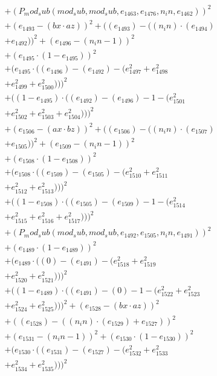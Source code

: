\documentclass[10pt, a4paper]{article}
\begin{document}
\begin{small}
\begin{align*}
& + (P_mod_sub(mod_sub, mod_sub, e_{1463}, e_{1476}, n_in, e_{1462}))^{2} \\
& + (e_{1493} - (bx  \cdot  az))^{2} + ((e_{1493}) - ((n_in)  \cdot  (e_{1494}) \\
& + e_{1492}))^{2} + (e_{1496} - (n_in - 1))^{2} \\
& + (e_{1495}  \cdot  (1 - e_{1495}))^{2} \\
& + (e_{1495}  \cdot  ((e_{1496}) - (e_{1492}) - (e_{1497}^{2} + e_{1498}^{2} \\
& + e_{1499}^{2} + e_{1500}^{2})))^{2} \\
& + ((1 - e_{1495})  \cdot  ((e_{1492}) - (e_{1496}) - 1 - (e_{1501}^{2} \\
& + e_{1502}^{2} + e_{1503}^{2} + e_{1504}^{2})))^{2} \\
& + (e_{1506} - (ax  \cdot  bz))^{2} + ((e_{1506}) - ((n_in)  \cdot  (e_{1507}) \\
& + e_{1505}))^{2} + (e_{1509} - (n_in - 1))^{2} \\
& + (e_{1508}  \cdot  (1 - e_{1508}))^{2} \\
& + (e_{1508}  \cdot  ((e_{1509}) - (e_{1505}) - (e_{1510}^{2} + e_{1511}^{2} \\
& + e_{1512}^{2} + e_{1513}^{2})))^{2} \\
& + ((1 - e_{1508})  \cdot  ((e_{1505}) - (e_{1509}) - 1 - (e_{1514}^{2} \\
& + e_{1515}^{2} + e_{1516}^{2} + e_{1517}^{2})))^{2} \\
& + (P_mod_sub(mod_sub, mod_sub, e_{1492}, e_{1505}, n_in, e_{1491}))^{2} \\
& + (e_{1489}  \cdot  (1 - e_{1489}))^{2} \\
& + (e_{1489}  \cdot  ((0) - (e_{1491}) - (e_{1518}^{2} + e_{1519}^{2} \\
& + e_{1520}^{2} + e_{1521}^{2})))^{2} \\
& + ((1 - e_{1489})  \cdot  ((e_{1491}) - (0) - 1 - (e_{1522}^{2} + e_{1523}^{2} \\
& + e_{1524}^{2} + e_{1525}^{2})))^{2} + (e_{1528} - (bx  \cdot  az))^{2} \\
& + ((e_{1528}) - ((n_in)  \cdot  (e_{1529}) + e_{1527}))^{2} \\
& + (e_{1531} - (n_in - 1))^{2} + (e_{1530}  \cdot  (1 - e_{1530}))^{2} \\
& + (e_{1530}  \cdot  ((e_{1531}) - (e_{1527}) - (e_{1532}^{2} + e_{1533}^{2} \\
& + e_{1534}^{2} + e_{1535}^{2})))^{2} \\

\end{align*}
\end{small}
\end{document}
